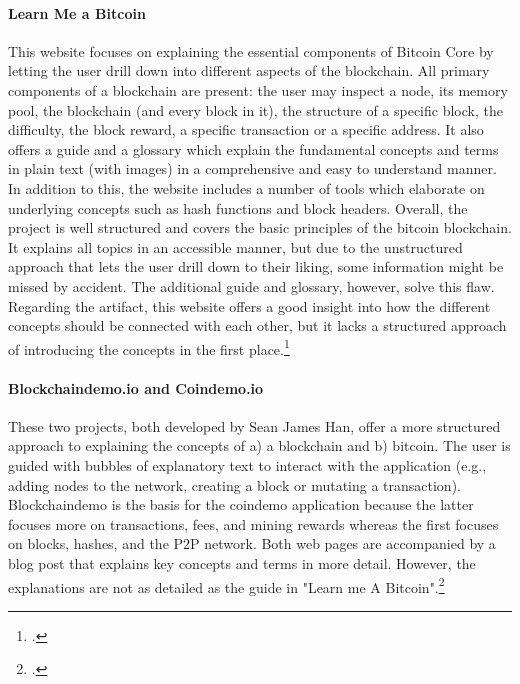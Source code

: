 \paragraph{Learn Me a Bitcoin} This website focuses on explaining the essential components of Bitcoin Core by letting the user drill down into different aspects of the blockchain. All primary components of a blockchain are present: the user may inspect a node, its memory pool, the blockchain (and every block in it), the structure of a specific block, the difficulty, the block reward, a specific transaction or a specific address. It also offers a guide and a glossary which explain the fundamental concepts and terms in plain text (with images) in a comprehensive and easy to understand manner. In addition to this, the website includes a number of tools which elaborate on underlying concepts such as hash functions and block headers. Overall, the project is well structured and covers the basic principles of the bitcoin blockchain. It explains all topics in an accessible manner, but due to the unstructured approach that lets the user drill down to their liking, some information might be missed by accident. The additional guide and glossary, however, solve this flaw. Regarding the artifact, this website offers a good insight into how the different concepts should be connected with each other, but it lacks a structured approach of introducing the concepts in the first place.\footcite[Cf.][]{WalkerLearnmeBitcoin2016}

\paragraph{Blockchaindemo.io and Coindemo.io} These two projects, both developed by Sean James Han, offer a more structured approach to explaining the concepts of a) a blockchain and b) bitcoin. The user is guided with bubbles of explanatory text to interact with the application (e.g., adding nodes to the network, creating a block or mutating a transaction). Blockchaindemo is the basis for the coindemo application because the latter focuses more on transactions, fees, and mining rewards whereas the first focuses on blocks, hashes, and the P2P network. Both web pages are accompanied by a blog post that explains key concepts and terms in more detail. However, the explanations are not as detailed as the guide in "Learn me A Bitcoin".\footcites[Cf.][]{HanHowdoesblockchain2017}[cf.][]{HanBlockchainDemo2017}[cf.][]{HanHowdoesbitcoin2017}[cf.][]{HanCoinDemo2017}

